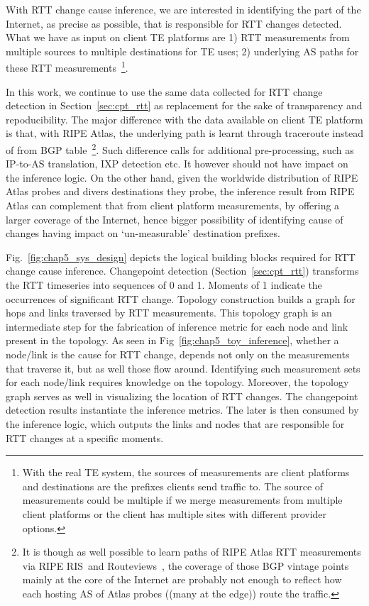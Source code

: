 With RTT change cause inference, we are interested in identifying the part of the Internet, as precise as possible, that is responsible for RTT changes detected. What we have as input on client TE platforms are 1) RTT measurements from multiple sources to multiple destinations for TE uses; 2) underlying AS paths for these RTT measurements~\footnote{With the real TE system, the sources of measurements are client platforms and destinations are the prefixes clients send traffic to. The source of measurements could be multiple if we merge measurements from multiple client platforms or the client has multiple sites with different provider options.}. 

In this work, we continue to use the same data collected for RTT change detection in Section~\ref{sec:cpt_rtt} as replacement for the sake of transparency and repoducibility. The major difference with the data available on client TE platform is that, with RIPE Atlas, the underlying path is learnt through traceroute instead of from BGP table~\footnote{It is though as well possible to learn paths of RIPE Atlas RTT measurements via RIPE RIS~\cite{ris}and Routeviews~\cite{routeviews}, the coverage of those BGP vintage points mainly at the core of the Internet are probably not enough to reflect how each hosting AS of Atlas probes ((many at the edge)) route the traffic.}. 
Such difference calls for additional pre-processing, such as IP-to-AS translation, IXP detection etc. It however should not have impact on the inference logic. On the other hand, given the worldwide distribution of RIPE Atlas probes and divers destinations they probe, the inference result from RIPE Atlas can complement that from client platform measurements, by offering a larger coverage of the Internet, hence bigger possibility of identifying cause of changes having impact on `un-measurable' destination prefixes.

Fig.~\ref{fig:chap5_sys_design} depicts the logical building blocks required for RTT change cause inference. Changepoint detection (Section~\ref{sec:cpt_rtt}) transforms the RTT timeseries into sequences of 0 and 1. Moments of 1 indicate the occurrences of significant RTT change.
Topology construction builds a graph for hops and links traversed by RTT measurements.
This topology graph is an intermediate step for the fabrication of inference metric for each node and link present in the topology. As seen in Fig~\ref{fig:chap5_toy_inference}, whether a node/link is the cause for RTT change, depends not only on the measurements that traverse it, but as well those flow around. Identifying such measurement sets for each node/link requires knowledge on the topology. Moreover, the topology graph serves as well in visualizing the location of RTT changes. 
The changepoint detection results instantiate the inference metrics.
The later is then consumed by the inference logic, which outputs the links and nodes that are responsible for RTT changes at a specific moments.

